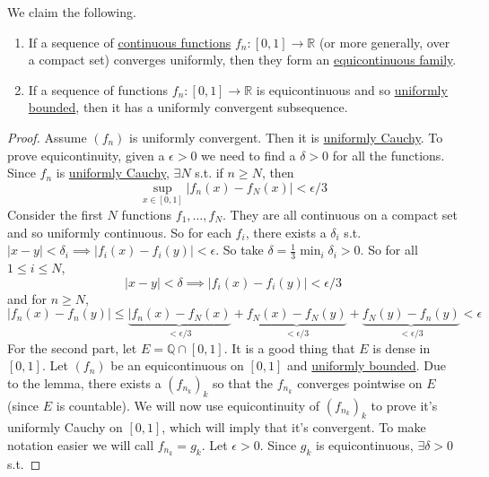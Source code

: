   \begin{theorem}
    \label{thm:arzela-ascollis-theorem}
    We claim the following. 
    \begin{enumerate}
      \item If a sequence of \hyperref[pst-def:continuous_func]{continuous functions} $f_n: [0, 1] \to \mathbb{R}$ (or more generally, over a compact set) converges uniformly, then they form an \hyperref[def:equicontinuous-family]{equicontinuous family}. 
      \item If a sequence of functions $f_n: [0, 1] \to \mathbb{R}$ is equicontinuous and so \hyperref[def:uniformly-bounded]{uniformly bounded}, then it has a uniformly convergent subsequence. 
    \end{enumerate}
  \end{theorem}
  \begin{proof}
    Assume $(f_n)$ is uniformly convergent. Then it is \hyperref[def:uniformly-cauchy]{uniformly Cauchy}. To prove equicontinuity, given a $\epsilon > 0$ we need to find a $\delta > 0$ for all the functions. Since $f_n$ is \hyperref[def:uniformly-cauchy]{uniformly Cauchy}, $\exists N$ s.t. if $n \geq N$, then 
    \begin{equation}
      \sup_{x \in [0, 1]} | f_n (x) - f_N (x) | < \epsilon/3
    \end{equation} 
    Consider the first $N$ functions $f_1, \ldots, f_N$. They are all continuous on a compact set and so uniformly continuous. So for each $f_i$, there exists a $\delta_i$ s.t. $|x - y| < \delta_i \implies |f_i (x) - f_i (y)| < \epsilon$. So take $\delta = \frac{1}{3} \min_i \delta_i > 0$. So for all $1 \leq i \leq N$, 
    \begin{equation}
      |x - y| < \delta \implies |f_i (x) - f_i (y)| < \epsilon/3
    \end{equation} 
    and for $n \geq N$, 
    \begin{equation}
      |f_n (x) - f_n (y)| \leq \underbrace{|f_n (x) - f_N (x)}_{< \epsilon/3} + \underbrace{f_N (x) - f_N (y)}_{< \epsilon/3} + \underbrace{f_N (y) - f_n (y)}_{< \epsilon/3} < \epsilon
    \end{equation} 
    For the second part, let $E = \mathbb{Q} \cap [0, 1]$. It is a good thing that $E$ is dense in $[0, 1]$. Let $(f_n)$ be an equicontinuous on $[0, 1]$ and \hyperref[def:uniformly-bounded]{uniformly bounded}. Due to the lemma, there exists a $(f_{n_k})_k$ so that the $f_{n_k}$ converges pointwise on $E$ (since $E$ is countable). We will now use equicontinuity of $(f_{n_k})_k$ to prove it's uniformly Cauchy on $[0, 1]$, which will imply that it's convergent. To make notation easier we will call $f_{n_k} = g_k$. Let $\epsilon > 0$. Since $g_k$ is equicontinuous, $\exists \delta > 0$ s.t. 

\end{proof}

